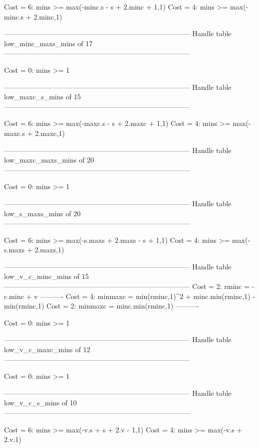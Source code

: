 Cost =  6:  mins >= max(-minc.s - s + 2.minc + 1,1)
Cost =  4:  mins >= max(-minc.s + 2.minc,1)

--------------------------------------------------------------------------------
Handle table low_minc_maxs_mins of 17
--------------------------------------------------------------------------------

Cost =  0:  mins >= 1

--------------------------------------------------------------------------------
Handle table low_maxc_s_mins of 15
--------------------------------------------------------------------------------

Cost =  6:  mins >= max(-maxc.s - s + 2.maxc + 1,1)
Cost =  4:  mins >= max(-maxc.s + 2.maxc,1)

--------------------------------------------------------------------------------
Handle table low_maxc_maxs_mins of 20
--------------------------------------------------------------------------------

Cost =  0:  mins >= 1

--------------------------------------------------------------------------------
Handle table low_s_maxs_mins of 20
--------------------------------------------------------------------------------

Cost =  6:  mins >= max(-s.maxs + 2.maxs - s + 1,1)
Cost =  4:  mins >= max(-s.maxs + 2.maxs,1)

--------------------------------------------------------------------------------
Handle table low_v_c_minc_mins of 15
--------------------------------------------------------------------------------
Cost =  2:  rminc   = -c.minc + v
----------
Cost =  4:  minmaxc = min(rminc,1)^2 + minc.min(rminc,1) - min(rminc,1)
Cost =  2:  minmaxc = minc.min(rminc,1)
----------

Cost =  0:  mins >= 1

--------------------------------------------------------------------------------
Handle table low_v_c_maxc_mins of 12
--------------------------------------------------------------------------------

Cost =  0:  mins >= 1

--------------------------------------------------------------------------------
Handle table low_v_c_s_mins of 10
--------------------------------------------------------------------------------

Cost =  6:  mins >= max(-v.s + s + 2.v - 1,1)
Cost =  4:  mins >= max(-v.s + 2.v,1)

